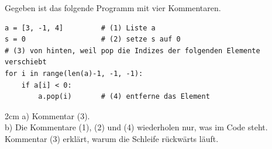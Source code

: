 \question[3]
Gegeben ist das folgende Programm mit vier Kommentaren.
\begin{lstlisting}
a = [3, -1, 4]         # (1) Liste a
s = 0                  # (2) setze s auf 0
# (3) von hinten, weil pop die Indizes der folgenden Elemente verschiebt
for i in range(len(a)-1, -1, -1):
    if a[i] < 0:
        a.pop(i)       # (4) entferne das Element
\end{lstlisting}
\begin{solutionbox}{2cm}
a) Kommentar (3). \\
b) Die Kommentare (1), (2) und (4) wiederholen nur, was im Code steht. Kommentar (3) erklärt, warum die Schleife rückwärts läuft.
\end{solutionbox}
